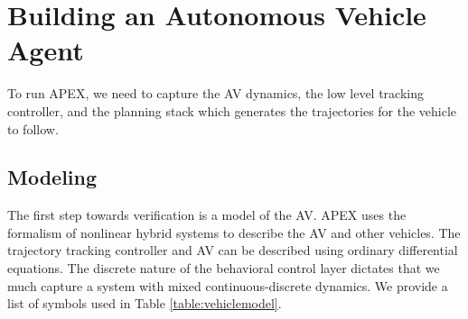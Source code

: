 \section{Building an Autonomous Vehicle Agent}
To run APEX, we need to capture the AV dynamics, the low level tracking controller, and the planning stack which generates the trajectories for the vehicle to follow. 
\subsection{Modeling}
\label{sec:model}
The first step towards verification is a model of the AV.
APEX uses the formalism of nonlinear hybrid systems to describe the AV and other vehicles.
The trajectory tracking controller and AV can be described using ordinary differential equations. 
The discrete nature of the behavioral control layer dictates that we much capture a system with mixed continuous-discrete dynamics. 
We provide a list of symbols used in Table \ref{table:vehiclemodel}.

